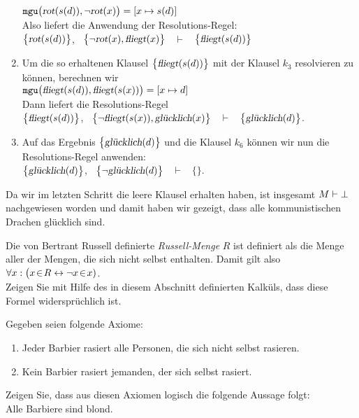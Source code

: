 \begin{enumerate}
      $\mathtt{mgu}\bigl(\textsl{rot}(s(d)), \neg \textsl{rot}(x)\bigr) = [x \mapsto s(d)]$
      \\[0.2cm]
      Also liefert die Anwendung der Resolutions-Regel:
      \\[0.2cm]
      \hspace*{1.3cm}
      $\bigl\{\textsl{rot}(s(d))\bigl\}$, \ $\bigl\{\neg \textsl{rot}(x), \textsl{fliegt}(x)\bigl\}$ \ $\vdash$ \ $\bigl\{\textsl{fliegt}(s(d))\bigl\}$
\item Um die so erhaltenen Klausel $\bigl\{\textsl{fliegt}(s(d))\bigl\}$ mit der Klausel
      $k_3$ resolvieren zu können, berechnen wir
      \\[0.2cm]
      \hspace*{1.3cm}
      $\mathtt{mgu}\bigl(\textsl{fliegt}(s(d)), \textsl{fliegt}(s(x))\bigr) = [x \mapsto d]$
      \\[0.2cm]
      Dann liefert die Resolutions-Regel
      \\[0.2cm]
      \hspace*{1.3cm}
      $\bigl\{\textsl{fliegt}(s(d))\bigl\}$, \ $\bigl\{\neg \textsl{fliegt}(s(x)), \textsl{glücklich}(x)\bigl\}$ \ $\vdash$ \ $\bigl\{\textsl{glücklich}(d)\bigl\}$.
\item Auf das Ergebnis $\bigl\{\textsl{glücklich}(d)\bigl\}$ und die Klausel $k_6$ können
      wir nun die Resolutions-Regel anwenden:
      \\[0.2cm]
      \hspace*{1.3cm}
      $\bigl\{\textsl{glücklich}(d)\bigl\}$, \  $\bigl\{\neg \textsl{glücklich}(d)\bigl\}$ \ $\vdash$ \ $\bigl\{\bigl\}$.
\end{enumerate}
Da wir im letzten Schritt die leere Klausel erhalten haben,  ist insgesamt $M \vdash
\bot$ 
nachgewiesen worden und damit haben wir gezeigt, dass alle kommunistischen Drachen glücklich sind. 
\eox
\pagebreak

\exercise
Die von Bertrant Russell definierte \emph{Russell-Menge} $R$ ist
definiert als die Menge aller der Mengen, die sich nicht selbst enthalten.   Damit gilt also
\\[0.2cm]
\hspace*{1.3cm}
$\forall x: \bigl( x \!\in\! R \leftrightarrow \neg x \!\in\! x)$.
\\[0.2cm]
Zeigen Sie mit Hilfe des in diesem Abschnitt definierten Kalküls, dass diese Formel
widersprüchlich ist. 
\vspace{0.3cm}

\exercise
Gegeben seien folgende Axiome:
\begin{enumerate}
\item Jeder Barbier rasiert alle Personen, die sich nicht selbst rasieren.
\item Kein Barbier rasiert jemanden, der sich selbst rasiert.
\end{enumerate}
Zeigen Sie, dass aus diesen Axiomen logisch die folgende Aussage folgt: \\[0.3cm]
\hspace*{1.3cm} Alle Barbiere sind blond.

